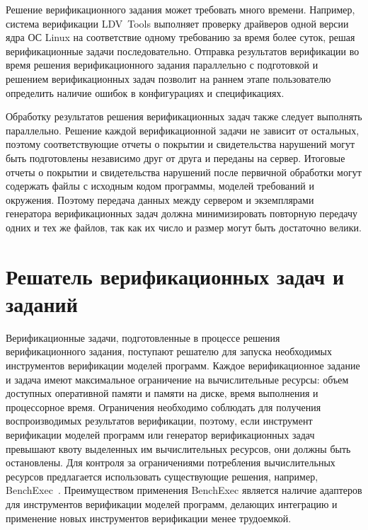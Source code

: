 Решение верификационного задания может требовать много времени.
Например, система верификации LDV~Tools выполняет проверку драйверов одной версии ядра ОС Linux на соответствие одному требованию за время более суток, решая верификационные задачи последовательно.
Отправка результатов верификации во время решения верификационного задания параллельно с подготовкой и решением верификационных задач позволит на раннем этапе пользователю определить наличие ошибок в конфигурациях и спецификациях.

Обработку результатов решения верификационных задач также следует выполнять параллельно.
Решение каждой верификационной задачи не зависит от остальных, поэтому соответствующие отчеты о покрытии и свидетельства нарушений могут быть подготовлены независимо друг от друга и переданы на сервер.
Итоговые отчеты о покрытии и свидетельства нарушений после первичной обработки могут содержать файлы с исходным кодом программы, моделей требований и окружения.
Поэтому передача данных между сервером и экземплярами генератора верификационных задач должна минимизировать повторную передачу одних и тех же файлов, так как их число и размер могут быть достаточно велики.

\section{Решатель верификационных задач и заданий}
Верификационные задачи, подготовленные в процессе решения верификационного задания, поступают решателю для запуска необходимых инструментов верификации моделей программ.
Каждое верификационное задание и задача имеют максимальное ограничение на вычислительные ресурсы: объем доступных оперативной памяти и памяти на диске, время выполнения и процессорное время.
Ограничения необходимо соблюдать для получения воспроизводимых результатов верификации, поэтому, если инструмент верификации моделей программ или генератор верификационных задач превышают квоту выделенных им вычислительных ресурсов, они должны быть остановлены.
Для контроля за ограничениями потребления вычислительных ресурсов  предлагается использовать существующие решения, например, BenchExec~\cite{Beyer2016}.
Преимуществом применения BenchExec является наличие адаптеров для инструментов верификации моделей программ, делающих интеграцию и применение новых инструментов верификации менее трудоемкой.


